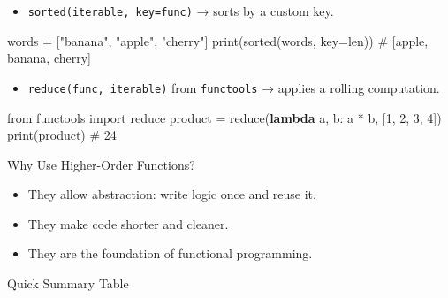 \documentclass[
  letterpaper,
  DIV=11,
  numbers=noendperiod]{scrreprt}
\newenvironment{Shaded}{\begin{snugshade}}{\end{snugshade}}
\newcommand{\BuiltInTok}[1]{\textcolor[rgb]{0.00,0.23,0.31}{#1}}
\newcommand{\CommentTok}[1]{\textcolor[rgb]{0.37,0.37,0.37}{#1}}
\newcommand{\DecValTok}[1]{\textcolor[rgb]{0.68,0.00,0.00}{#1}}
\newcommand{\ImportTok}[1]{\textcolor[rgb]{0.00,0.46,0.62}{#1}}
\newcommand{\KeywordTok}[1]{\textcolor[rgb]{0.00,0.23,0.31}{\textbf{#1}}}
\newcommand{\NormalTok}[1]{\textcolor[rgb]{0.00,0.23,0.31}{#1}}
\newcommand{\OperatorTok}[1]{\textcolor[rgb]{0.37,0.37,0.37}{#1}}
\newcommand{\StringTok}[1]{\textcolor[rgb]{0.13,0.47,0.30}{#1}}
\providecommand{\tightlist}{%
  \setlength{\itemsep}{0pt}\setlength{\parskip}{0pt}}
\begin{document}
\begin{itemize}
\tightlist
\item
  \texttt{sorted(iterable,\ key=func)} → sorts by a custom key.
\end{itemize}

\begin{Shaded}
\begin{Highlighting}[]
\NormalTok{words }\OperatorTok{=}\NormalTok{ [}\StringTok{"banana"}\NormalTok{, }\StringTok{"apple"}\NormalTok{, }\StringTok{"cherry"}\NormalTok{]}
\BuiltInTok{print}\NormalTok{(}\BuiltInTok{sorted}\NormalTok{(words, key}\OperatorTok{=}\BuiltInTok{len}\NormalTok{))   }\CommentTok{\# [\textquotesingle{}apple\textquotesingle{}, \textquotesingle{}banana\textquotesingle{}, \textquotesingle{}cherry\textquotesingle{}]}
\end{Highlighting}
\end{Shaded}

\begin{itemize}
\tightlist
\item
  \texttt{reduce(func,\ iterable)} from \texttt{functools} → applies a
  rolling computation.
\end{itemize}

\begin{Shaded}
\begin{Highlighting}[]
\ImportTok{from}\NormalTok{ functools }\ImportTok{import} \BuiltInTok{reduce}
\NormalTok{product }\OperatorTok{=} \BuiltInTok{reduce}\NormalTok{(}\KeywordTok{lambda}\NormalTok{ a, b: a }\OperatorTok{*}\NormalTok{ b, [}\DecValTok{1}\NormalTok{, }\DecValTok{2}\NormalTok{, }\DecValTok{3}\NormalTok{, }\DecValTok{4}\NormalTok{])}
\BuiltInTok{print}\NormalTok{(product)   }\CommentTok{\# 24}
\end{Highlighting}
\end{Shaded}

Why Use Higher-Order Functions?

\begin{itemize}
\tightlist
\item
  They allow abstraction: write logic once and reuse it.
\item
  They make code shorter and cleaner.
\item
  They are the foundation of functional programming.
\end{itemize}

Quick Summary Table
\end{document}
